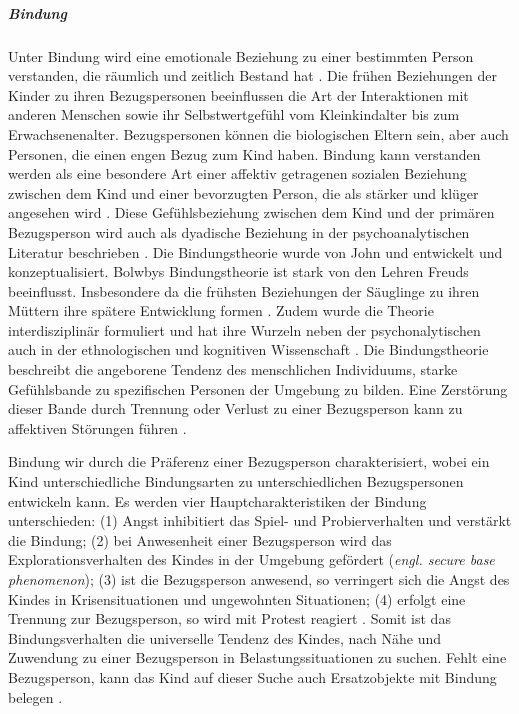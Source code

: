 \subparagraph{Bindung}\label{par:Bindung}
Unter Bindung wird eine emotionale Beziehung zu einer bestimmten Person verstanden, die räumlich und zeitlich Bestand hat \cite[S.~585 ff.]{Siegler2008}. Die frühen Beziehungen der Kinder zu ihren Bezugspersonen beeinflussen die Art der Interaktionen mit anderen Menschen sowie ihr Selbstwertgefühl vom Kleinkindalter bis zum Erwachsenenalter. Bezugspersonen können die biologischen Eltern sein, aber auch Personen, die einen engen Bezug zum Kind haben. Bindung kann verstanden werden als eine besondere Art einer affektiv getragenen sozialen Beziehung zwischen dem Kind und einer bevorzugten Person, die als stärker und klüger angesehen wird \cite{Biringen1994}. Diese Gefühlsbeziehung zwischen dem Kind und der primären Bezugsperson wird auch als dyadische Beziehung in der psychoanalytischen Literatur beschrieben \cite[S.~91 ff.]{Resch1999}. Die Bindungstheorie wurde von John \nohyphens{} und  entwickelt und konzeptualisiert. Bolwbys Bindungstheorie ist stark von den Lehren Freuds beeinflusst. Insbesondere da die frühsten Beziehungen der Säuglinge zu ihren Müttern ihre spätere Entwicklung formen \cite{Siegler2008}. Zudem wurde die Theorie interdisziplinär formuliert und hat ihre Wurzeln neben der psychonalytischen auch in der ethnologischen und kognitiven Wissenschaft \cite{Resch1999}. Die Bindungstheorie beschreibt die angeborene Tendenz des menschlichen Individuums, starke Gefühlsbande zu spezifischen Personen der Umgebung zu bilden. Eine Zerstörung dieser Bande durch Trennung oder Verlust zu einer Bezugsperson kann zu affektiven Störungen führen \cite{Resch1999}. 

Bindung wir durch die Präferenz einer Bezugsperson charakterisiert, wobei ein Kind unterschiedliche Bindungsarten zu unterschiedlichen Bezugspersonen entwickeln kann. Es werden vier Hauptcharakteristiken der Bindung unterschieden: (1) Angst inhibitiert das Spiel- und Probierverhalten und verstärkt die Bindung; (2) bei Anwesenheit einer Bezugsperson wird das Explorationsverhalten des Kindes in der Umgebung gefördert (\textit{engl. secure base phenomenon}); (3) ist die Bezugsperson anwesend, so verringert sich die Angst des Kindes in Krisensituationen und ungewohnten Situationen; (4) erfolgt eine Trennung zur Bezugsperson, so wird mit Protest reagiert \cite[S.~99]{Resch1999}. Somit ist das Bindungsverhalten die universelle Tendenz des Kindes, nach Nähe und Zuwendung zu einer Bezugsperson in Belastungssituationen zu suchen. Fehlt eine Bezugsperson, kann das Kind auf dieser Suche auch Ersatzobjekte mit Bindung belegen \cite{Resch1999}.

